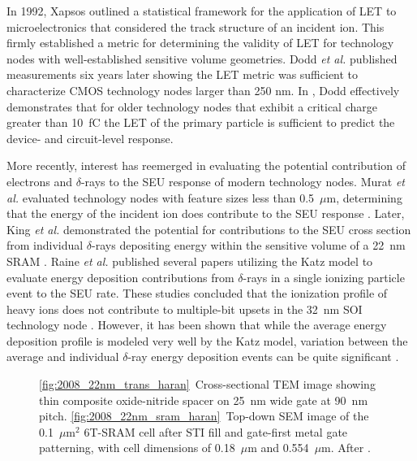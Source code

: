 In 1992, Xapsos \cite{Xapsos:1992tc} outlined a statistical framework for the application of LET to microelectronics that considered the track structure of an incident ion. 
This firmly established a metric for determining the validity of LET for technology nodes with well-established sensitive volume geometries. 
Dodd \emph{et al.} \cite{Dodd:1998tn} published measurements six years later showing the LET metric was sufficient to characterize CMOS technology nodes larger than 250 nm.
In \cite{Dodd:1998tn}, Dodd effectively demonstrates that for older technology nodes that exhibit a critical charge greater than 10~fC the LET of the primary particle is sufficient to predict the device- and circuit-level response.

More recently, interest has reemerged in evaluating the potential contribution of electrons and $\delta$-rays to the SEU response of modern technology nodes.
Murat \emph{et al.} evaluated technology nodes with feature sizes less than 0.5~$\mu$m, determining that the energy of the incident ion does contribute to the SEU response \cite{Murat:kk}.
Later, King \emph{et al.} demonstrated the potential for contributions to the SEU cross section from individual $\delta$-rays depositing energy within the sensitive volume of a 22~nm SRAM \cite{King:2010cu}.
Raine \emph{et al.} published several papers utilizing the Katz model to evaluate energy deposition contributions from $\delta$-rays in a single ionizing particle event to the SEU rate. 
These studies concluded that the ionization profile of heavy ions does not contribute to multiple-bit upsets in the 32~nm SOI technology node \cite{Raine:gk}.
However, it has been shown that while the average energy deposition profile is modeled very well by the Katz model, variation between the average and individual $\delta$-ray energy deposition events can be quite significant \cite{King:2012cb}.

\begin{figure}[htbp]
    \centering
    \caption[\ref{fig:2008_22nm_trans_haran}~Cross-sectional TEM image showing thin composite oxide-nitride spacer on 25~nm wide gate at 90~nm pitch. \ref{fig:2008_22nm_sram_haran}~Top-down SEM image of the 0.1~$\mu$m$^2$ 6T-SRAM cell after STI fill and gate-first metal gate patterning, with cell dimensions of 0.18~$\mu$m and 0.554~$\mu$m.]{\ref{fig:2008_22nm_trans_haran}~Cross-sectional TEM image showing thin composite oxide-nitride spacer on 25~nm wide gate at 90~nm pitch. \ref{fig:2008_22nm_sram_haran}~Top-down SEM image of the 0.1~$\mu$m$^2$ 6T-SRAM cell after STI fill and gate-first metal gate patterning, with cell dimensions of 0.18~$\mu$m and 0.554~$\mu$m. After \cite{Haran:2008ta}.}
    \label{fig:ibm_22nm_trans_sram_spacing}
\end{figure}

